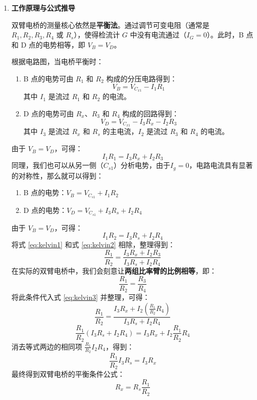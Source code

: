 \documentclass[]{../../templates/Report}%
\begin{document}
\begin{enumerate}[label=(\arabic*)]
\item \textbf{工作原理与公式推导}

双臂电桥的测量核心依然是\textbf{平衡法}。通过调节可变电阻（通常是 $R_1, R_2, R_3, R_4$ 或 $R_s$），使得检流计 $G$ 中没有电流通过（$I_G = 0$）。此时，B 点和 D 点的电势相等，即 $V_B = V_D$。

根据电路图，当电桥平衡时：
\begin{enumerate}[label=\roman*.]
    \item B 点的电势可由 $R_1$ 和 $R_2$ 构成的分压电路得到：
    \begin{equation}
    V_B = V_{C_{x1}} - I_1 R_1
    \end{equation}
    其中 $I_1$ 是流过 $R_1$ 和 $R_2$ 的电流。

    \item D 点的电势可由 $R_x$、$R_3$ 和 $R_4$ 构成的回路得到：
    \begin{equation}
    V_D = V_{C_{x1}} - I_3 R_x - I_2 R_3
    \end{equation}
    其中 $I_3$ 是流过 $R_x$ 和 $R_s$ 的主电流，$I_2$ 是流过 $R_3$ 和 $R_4$ 的电流。
\end{enumerate}
由于 $V_B = V_D$，可得：
\begin{equation}
    I_1 R_1 = I_3 R_x + I_2 R_3 \label{eq:kelvin1}
\end{equation}
同理，我们也可以从另一侧（$C_{s1}$）分析电势，由于$I_g=0$，电路电流具有显著的对称性，那么就可以得到：
\begin{enumerate}[label=\roman*.]
    \item B 点的电势：$V_B = V_{C_{s1}} + I_1 R_2$
    \item D 点的电势：$V_D = V_{C_{s1}} + I_3 R_s + I_2 R_4$
\end{enumerate}
由于 $V_B = V_D$，可得：
\begin{equation}
    I_1 R_2 = I_3 R_s + I_2 R_4 \label{eq:kelvin2}
\end{equation}
将式 \eqref{eq:kelvin1} 和式 \eqref{eq:kelvin2} 相除，整理得到：
\begin{equation}
    \frac{R_1}{R_2} = \frac{I_3 R_x + I_2 R_3}{I_3 R_s + I_2 R_4} \label{eq:kelvin3}
\end{equation}
在实际的双臂电桥中，我们会刻意让\textbf{两组比率臂的比例相等}，即：
\begin{equation}
\frac{R_1}{R_2} = \frac{R_3}{R_4}
\end{equation}
将此条件代入式 \eqref{eq:kelvin3} 并整理，可得：
\begin{equation}
\frac{R_1}{R_2} = \frac{I_3 R_x + I_2 (\frac{R_1}{R_2}R_4)}{I_3 R_s + I_2 R_4}
\end{equation}
\begin{equation}
\frac{R_1}{R_2} (I_3 R_s + I_2 R_4) = I_3 R_x + I_2 \frac{R_1}{R_2} R_4
\end{equation}
消去等式两边的相同项 $\frac{R_1}{R_2} I_2 R_4$，得到：
\begin{equation}
\frac{R_1}{R_2} I_3 R_s = I_3 R_x
\end{equation}
最终得到双臂电桥的平衡条件公式：
\begin{equation}
    \boxed{R_x = R_s \frac{R_1}{R_2}}
\end{equation}


\end{enumerate}
\end{document}
